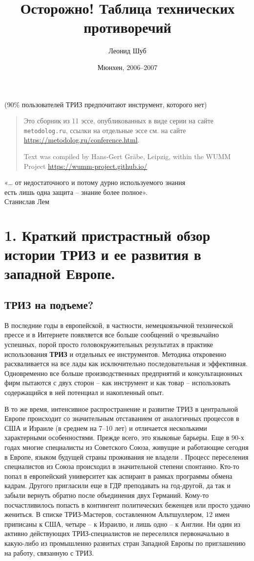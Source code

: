 \documentclass[11pt,a4paper]{article}
\title{Осторожно! Таблица технических противоречий}
\author{Леонид Шуб}
\date{Мюнхен, 2006--2007}
\begin{document}
\maketitle

(90\% пользователей ТРИЗ предпочитают инструмент, которого нет)

\begin{quote}
  Это сборник из 11 эссе, опубликованных в виде серии на сайте
  \texttt{metodolog.ru}, ссылки на отдельные эссе см. на сайте
  \url{https://metodolog.ru/conference.html}.

  Text was compiled by Hans-Gert Gr\"abe, Leipzig, within the WUMM Project
  \url{https://wumm-project.github.io/}
\end{quote}

\begin{flushright}
  «… от недостаточного и потому дурно используемого знания\\ есть лишь одна
  защита -- знание более полное».\\ Станислав Лем
\end{flushright}
\section*{1. Краткий пристрастный обзор истории ТРИЗ и ее развития в западной
  Европе.} 

\subsection*{ТРИЗ на подъеме?}

В последние годы в европейской, в частности, немецкоязычной технической прессе
и в Интернете появляется все больше сообщений о чрезвычайно успешных, порой
просто головокружительных результатах в практике использования \textbf{ТРИЗ} и
отдельных ее инструментов. Методика откровенно расхваливается на все лады как
исключительно последовательная и эффективная. Одновременно все больше
производственных предприятий и консультационных фирм пытаются с двух сторон --
как инструмент и как товар -- использовать содержащийся в ней потенциал и
накопленный опыт.

В то же время, интенсивное распространение и развитие ТРИЗ в центральной
Европе происходит со значительным отставанием от аналогичных процессов в США и
Израиле (в среднем на 7--10 лет) и отличается несколькими характерными
особенностями. Прежде всего, это языковые барьеры. Еще в 90-х годах многие
специалисты из Советского Союза, живущие и работающие сегодня в Европе, языком
будущей страны проживания не владели \cite{Shub2004}. Процесс переселения
специалистов из Союза происходил в значительной степени спонтанно. Кто-то
попал в европейский университет как аспирант в рамках программы обмена кадрам.
Другого пригласили еще в ГДР преподавать на год-другой, да так и забыли
вернуть обратно после объединения двух Германий. Кому-то посчастливилось
попасть в контингент политических беженцев или просто удачно жениться. В
списке ТРИЗ-Мастеров, составленном Альтшуллером, 12 имен приписаны к США,
четыре -- к Израилю, и лишь одно -- к Англии. Ни один из активно действующих
ТРИЗ-специалистов не переселился первоначально в какую-либо из промышленно
развитых стран Западной Европы по приглашению на работу, связанную с ТРИЗ.
\end{document}
